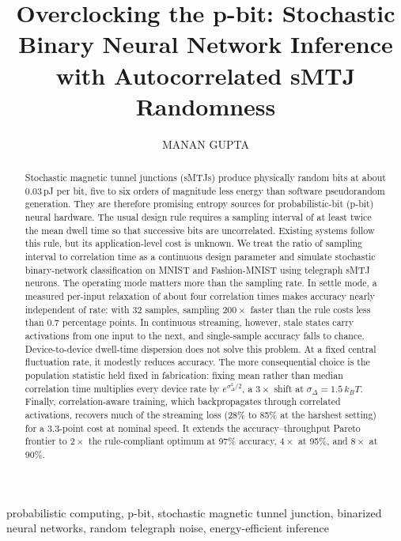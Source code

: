 \documentclass{ieeeaccess}
\begin{document}

\title{Overclocking the p-bit: Stochastic Binary Neural Network Inference with Autocorrelated sMTJ Randomness}

\author{\uppercase{Manan Gupta}}
\address[1]{The Harker School, San Jose, CA 95129 USA (e-mail: mnn@yogins.com)}


\begin{abstract}
Stochastic magnetic tunnel junctions (sMTJs) produce physically random bits
at about 0.03\,pJ per bit, five to six orders of magnitude less energy than
software pseudorandom generation. They are therefore promising entropy
sources for probabilistic-bit (p-bit) neural hardware. The usual design rule
requires a sampling interval of at least twice the mean dwell time so that
successive bits are uncorrelated. Existing systems follow this rule, but its
application-level cost is unknown. We treat the ratio of sampling interval to
correlation time as a continuous design parameter and simulate stochastic
binary-network classification on MNIST and Fashion-MNIST using telegraph
sMTJ neurons. The operating mode matters more than the sampling rate. In
settle mode, a measured per-input relaxation of about four correlation times
makes accuracy nearly independent of rate: with 32 samples, sampling
$200\times$ faster than the rule costs less than 0.7 percentage points. In
continuous streaming, however, stale states carry activations from one input
to the next, and single-sample accuracy falls to chance. Device-to-device
dwell-time dispersion does not solve this problem. At a fixed central
fluctuation rate, it modestly reduces accuracy. The more consequential choice
is the population statistic held fixed in fabrication: fixing mean rather
than median correlation time multiplies every device rate by
$e^{\sigma_\Delta^2/2}$, a $3\times$ shift at $\sigma_\Delta=1.5\,k_BT$.
Finally, correlation-aware training, which backpropagates through
correlated activations, recovers much of the streaming loss (28\% to 85\%
at the harshest setting) for a 3.3-point cost at nominal speed. It extends
the accuracy--throughput Pareto frontier to $2\times$ the rule-compliant
optimum at 97\% accuracy, $4\times$ at 95\%, and $8\times$ at 90\%.
\end{abstract}

\begin{keywords}
probabilistic computing, p-bit, stochastic magnetic tunnel junction,
binarized neural networks, random telegraph noise, energy-efficient inference
\end{keywords}
\end{document}
